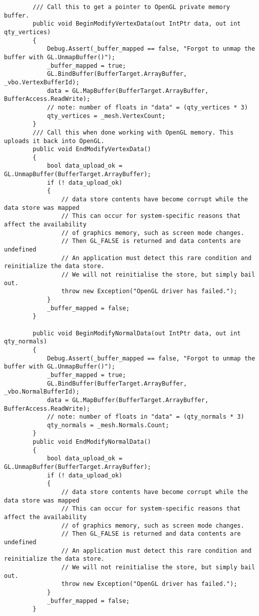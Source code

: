 \begin{scriptsize}
\begin{verbatim}
        /// Call this to get a pointer to OpenGL private memory buffer.
        public void BeginModifyVertexData(out IntPtr data, out int qty_vertices)
        {
            Debug.Assert(_buffer_mapped == false, "Forgot to unmap the buffer with GL.UnmapBuffer()");
            _buffer_mapped = true;
            GL.BindBuffer(BufferTarget.ArrayBuffer, _vbo.VertexBufferId);
            data = GL.MapBuffer(BufferTarget.ArrayBuffer, BufferAccess.ReadWrite);
            // note: number of floats in "data" = (qty_vertices * 3)
            qty_vertices = _mesh.VertexCount;
        }
        /// Call this when done working with OpenGL memory. This uploads it back into OpenGL.
        public void EndModifyVertexData()
        {
            bool data_upload_ok = GL.UnmapBuffer(BufferTarget.ArrayBuffer);
            if (! data_upload_ok)
            {
                // data store contents have become corrupt while the data store was mapped
                // This can occur for system-specific reasons that affect the availability 
                // of graphics memory, such as screen mode changes. 
                // Then GL_FALSE is returned and data contents are undefined
                // An application must detect this rare condition and reinitialize the data store. 
                // We will not reinitialise the store, but simply bail out.
                throw new Exception("OpenGL driver has failed.");
            }
            _buffer_mapped = false;
        }

        public void BeginModifyNormalData(out IntPtr data, out int qty_normals)
        {
            Debug.Assert(_buffer_mapped == false, "Forgot to unmap the buffer with GL.UnmapBuffer()");
            _buffer_mapped = true;
            GL.BindBuffer(BufferTarget.ArrayBuffer, _vbo.NormalBufferId);
            data = GL.MapBuffer(BufferTarget.ArrayBuffer, BufferAccess.ReadWrite);
            // note: number of floats in "data" = (qty_normals * 3)
            qty_normals = _mesh.Normals.Count;
        }
        public void EndModifyNormalData()
        {
            bool data_upload_ok = GL.UnmapBuffer(BufferTarget.ArrayBuffer);
            if (! data_upload_ok)
            {
                // data store contents have become corrupt while the data store was mapped
                // This can occur for system-specific reasons that affect the availability 
                // of graphics memory, such as screen mode changes. 
                // Then GL_FALSE is returned and data contents are undefined
                // An application must detect this rare condition and reinitialize the data store. 
                // We will not reinitialise the store, but simply bail out.
                throw new Exception("OpenGL driver has failed.");
            }
            _buffer_mapped = false;
        }


\end{verbatim}
\end{scriptsize}
